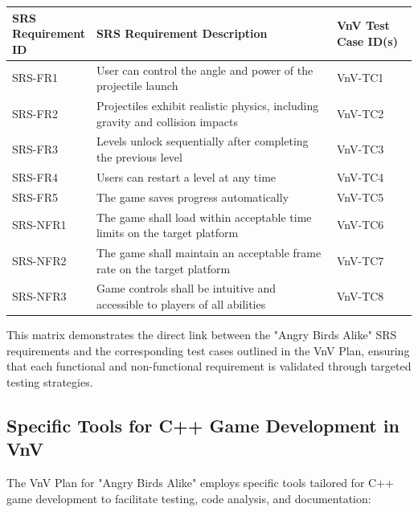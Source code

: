 \documentclass[12pt]{article}
\begin{document}
\begin{longtable}{|p{0.2\linewidth}|p{0.6\linewidth}|p{0.2\linewidth}|}
\hline
\textbf{SRS Requirement ID} & \textbf{SRS Requirement Description} & \textbf{VnV Test Case ID(s)} \\
\hline
SRS-FR1 & User can control the angle and power of the projectile launch & VnV-TC1 \\\hline
SRS-FR2 & Projectiles exhibit realistic physics, including gravity and collision impacts & VnV-TC2 \\\hline
SRS-FR3 & Levels unlock sequentially after completing the previous level & VnV-TC3 \\\hline
SRS-FR4 & Users can restart a level at any time & VnV-TC4 \\\hline
SRS-FR5 & The game saves progress automatically & VnV-TC5 \\\hline
SRS-NFR1 & The game shall load within acceptable time limits on the target platform & VnV-TC6 \\\hline
SRS-NFR2 & The game shall maintain an acceptable frame rate on the target platform & VnV-TC7 \\\hline
SRS-NFR3 & Game controls shall be intuitive and accessible to players of all abilities & VnV-TC8 \\\hline
\hline
\end{longtable}

This matrix demonstrates the direct link between the "Angry Birds Alike" SRS requirements and the corresponding test cases outlined in the VnV Plan, ensuring that each functional and non-functional requirement is validated through targeted testing strategies.

\subsection{Specific Tools for C++ Game Development in VnV}
The VnV Plan for "Angry Birds Alike" employs specific tools tailored for C++ game development to facilitate testing, code analysis, and documentation:
\end{document}
